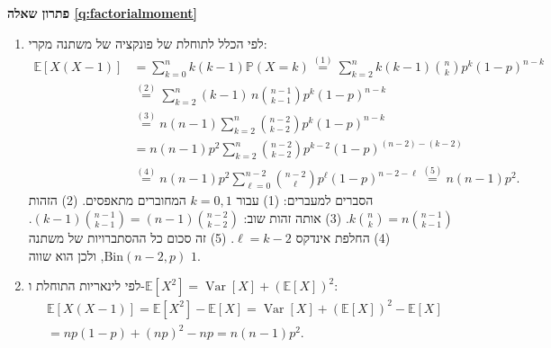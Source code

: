 \documentclass[11pt,a4paper]{report}
\newcommand{\flag}{\tikz[baseline=-0.1ex,x=0.9ex,y=0.9ex]{\draw[line width=0.5pt] (0,-0.3)--(0,1.6); \fill (0,1.6)--(1.2,1.2)--(0,0.8)--cycle;}}
\newcounter{todo}
\newcommand{\addtodo}[1]{\refstepcounter{todo}%
  \addcontentsline{tdo}{todo}{\protect\numberline{\thetodo}#1}}
\newcommand{\needcheck}[1]{\addtodo{#1}%
  {\color{todoc}\sffamily\small\,[\textbf{\flag{}\,\thetodo\ לבדיקה:} #1]\,}}
\renewcommand{\needcheck}[1]{}
\newcommand{\PP}{\mathbb{P}}
\newcommand{\E}{\mathbb{E}}
\DeclareMathOperator{\Var}{Var}
\newcommand{\Bin}{\mathrm{Bin}}
\newenvironment{solution}[1]{\par\bigskip\noindent
  {\sffamily\bfseries\color{thmc}פתרון שאלה \ref{q:#1}}\par\nopagebreak\smallskip}%
  {\par\medskip\noindent{\color{exc!50}\rule{\linewidth}{0.4pt}}\par}
\newcommand{\ans}[1]{\boxed{#1}}
\begin{document}
\begin{solution}{factorialmoment}
\begin{enumerate}[label=(\alph*)]
  \item לפי הכלל לתוחלת של פונקציה של משתנה מקרי:
  \[
  \begin{split}
    \E[X(X-1)]&=\sum_{k=0}^nk(k-1)\PP(X=k)\overset{(1)}=\sum_{k=2}^nk(k-1)\binom nkp^k(1-p)^{n-k}\\
    &\overset{(2)}=\sum_{k=2}^n(k-1)\,n\binom{n-1}{k-1}p^k(1-p)^{n-k}\\
    &\overset{(3)}=n(n-1)\sum_{k=2}^n\binom{n-2}{k-2}p^k(1-p)^{n-k}
    \\&=n(n-1)p^2\sum_{k=2}^n\binom{n-2}{k-2}p^{k-2}(1-p)^{(n-2)-(k-2)}\\
    &\overset{(4)}=n(n-1)p^2\sum_{\ell=0}^{n-2}\binom{n-2}\ell p^\ell(1-p)^{n-2-\ell}\overset{(5)}=\ans{n(n-1)p^2}.
  \end{split}
  \]
  הסברים למעברים:
  (1) עבור $k=0,1$ המחוברים מתאפסים.
  (2) הזהות $k\binom nk=n\binom{n-1}{k-1}$.
  (3) אותה זהות שוב: $(k-1)\binom{n-1}{k-1}=(n-1)\binom{n-2}{k-2}$.
  (4) החלפת אינדקס $\ell=k-2$.
  (5) זה סכום כל ההסתברויות של משתנה $\Bin(n-2,p)$, ולכן הוא שווה $1$.
  \needcheck{בהסבר למעבר (2) בדף הפתרונות נכתב $k\binom nk=(n-1)\binom{n-1}{k-1}$; תיקנתי ל-$n\binom{n-1}{k-1}$}
  \item לפי לינאריות התוחלת ו-$\E[X^2]=\Var[X]+(\E[X])^2$:
  \begin{multline*}
    \E[X(X-1)]=\E[X^2]-\E[X]=\Var[X]+(\E[X])^2-\E[X]\\
    =np(1-p)+(np)^2-np=\ans{n(n-1)p^2}.
  \end{multline*}
\end{enumerate}
\end{solution}
\end{document}
